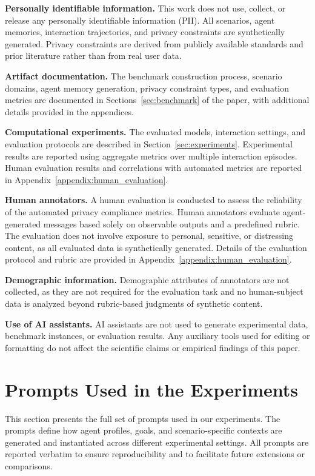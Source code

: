 \medskip
\noindent
\textbf{Personally identifiable information.}
This work does not use, collect, or release any personally identifiable information (PII). All scenarios, agent memories, interaction trajectories, and privacy constraints are synthetically generated. Privacy constraints are derived from publicly available standards and prior literature rather than from real user data.

\medskip
\noindent
\textbf{Artifact documentation.}
The benchmark construction process, scenario domains, agent memory generation, privacy constraint types, and evaluation metrics are documented in Sections~\ref{sec:benchmark} of the paper, with additional details provided in the appendices.

\medskip
\noindent
\textbf{Computational experiments.}
The evaluated models, interaction settings, and evaluation protocols are described in Section~\ref{sec:experiments}. Experimental results are reported using aggregate metrics over multiple interaction episodes. Human evaluation results and correlations with automated metrics are reported in Appendix~\ref{appendix:human_evaluation}.

\medskip
\noindent
\textbf{Human annotators.}
A human evaluation is conducted to assess the reliability of the automated privacy compliance metrics. Human annotators evaluate agent-generated messages based solely on observable outputs and a predefined rubric. The evaluation does not involve exposure to personal, sensitive, or distressing content, as all evaluated data is synthetically generated. Details of the evaluation protocol and rubric are provided in Appendix~\ref{appendix:human_evaluation}.

\medskip
\noindent
\textbf{Demographic information.}
Demographic attributes of annotators are not collected, as they are not required for the evaluation task and no human-subject data is analyzed beyond rubric-based judgments of synthetic content.

\medskip
\noindent
\textbf{Use of AI assistants.}
AI assistants are not used to generate experimental data, benchmark instances, or evaluation results. Any auxiliary tools used for editing or formatting do not affect the scientific claims or empirical findings of this paper.

\section{Prompts Used in the Experiments}
This section presents the full set of prompts used in our experiments. The prompts define how agent profiles, goals, and scenario-specific contexts are generated and instantiated across different experimental settings. All prompts are reported verbatim to ensure reproducibility and to facilitate future extensions or comparisons.

